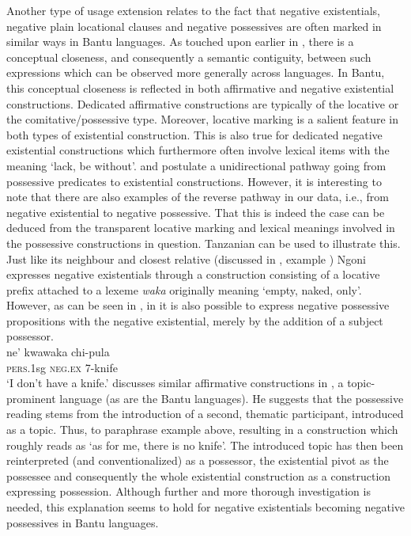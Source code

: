 \documentclass[output=paper]{langscibook}
\begin{document}
Another type of usage extension relates to the fact that negative
existentials, negative plain locational clauses and negative possessives
are often marked in similar ways in Bantu languages. As touched upon
earlier in , there is a conceptual closeness, and
consequently a semantic contiguity, between such expressions which can be
observed more generally across languages. In Bantu, this conceptual
closeness is reflected in both affirmative and negative existential
constructions. Dedicated affirmative constructions are typically of the
locative or the comitative\slash possessive type. Moreover, locative marking is a
salient feature in both types of existential construction. This is also
true for dedicated negative existential constructions which furthermore
often involve lexical items with the meaning `lack, be without'.
\citet{Heine1997} and \citet[241--242]{HeineKuteva2002} postulate a
unidirectional pathway going from possessive predicates to existential
constructions. However, it is interesting to note that there are also
examples of the reverse pathway in our data, i.e., from negative
existential to negative possessive. That this is indeed the case can be
deduced from the transparent locative marking and lexical meanings involved
in the possessive constructions in question. Tanzanian  can be
used to illustrate this. Just like its neighbour and closest relative
 (discussed in , example
) Ngoni expresses negative existentials through a
construction consisting of a locative prefix attached to a lexeme
\textit{waka} originally meaning `empty, naked, only'. However, as can be
seen in , in  it is also possible to express
negative possessive propositions with the negative existential, merely by
the addition of a subject possessor.
%
\ea\label{ex:ngoni-knife} \\ \gll ne' kwawaka chi-pula\\ \textsc{pers}.1sg
\textsc{neg.ex} 7-knife\\ \glt 	`I don't have a knife.' \z
%
\citet{Koch2012} discusses similar affirmative constructions in
, a to\-pic-pro\-mi\-nent language (as are the Bantu
languages). He suggests that the possessive reading stems from the
introduction of a second, thematic participant, introduced as a topic.
Thus, to paraphrase example  above, resulting in a
construction which roughly reads as `as for me, there is no knife'. The
introduced topic has then been reinterpreted (and conventionalized) as a
possessor, the existential pivot as the possessee and consequently the
whole existential construction as a construction expressing possession.
Although further and more thorough investigation is needed, this
explanation seems to hold for negative existentials becoming negative
possessives in Bantu languages.
\end{document}

